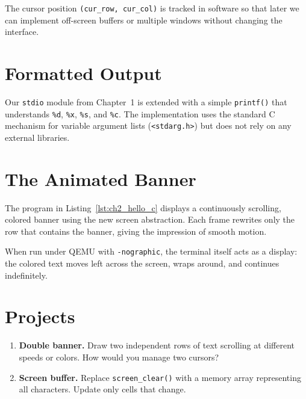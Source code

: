 The cursor position \texttt{(cur\_row, cur\_col)} is tracked in software so that
later we can implement off-screen buffers or multiple windows without changing
the interface.

\section{Formatted Output}

Our \texttt{stdio} module from Chapter~1 is extended with a simple
\texttt{printf()} that understands \texttt{\%d}, \texttt{\%x}, \texttt{\%s},
and \texttt{\%c}.  The implementation uses the standard C mechanism for
variable argument lists (\texttt{<stdarg.h>}) but does not rely on any external
libraries.

\begin{figure}[H]
\centering
\begin{minipage}{0.9\textwidth}

\end{minipage}
\end{figure}

\section{The Animated Banner}

The program in Listing~\ref{lst:ch2_hello_c} displays a continuously scrolling,
colored banner using the new screen abstraction.  Each frame rewrites only the
row that contains the banner, giving the impression of smooth motion.

\begin{figure}[H]
\centering
\begin{minipage}{0.9\textwidth}

\end{minipage}
\end{figure}

When run under QEMU with \texttt{-nographic}, the terminal itself acts as a
display: the colored text moves left across the screen, wraps around, and
continues indefinitely.

\section{Projects}

\begin{enumerate}
  \item \textbf{Double banner.}
        Draw two independent rows of text scrolling at different speeds or
        colors.  How would you manage two cursors?
  \item \textbf{Screen buffer.}
        Replace \texttt{screen\_clear()} with a memory array representing all
        characters.  Update only cells that change.
\end{enumerate}
